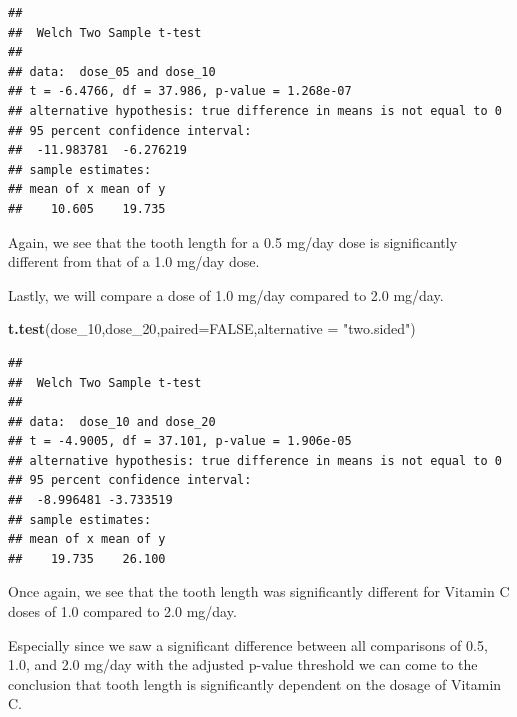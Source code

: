 \documentclass[
]{article}
\newenvironment{Shaded}{\begin{snugshade}}{\end{snugshade}}
\newcommand{\DataTypeTok}[1]{\textcolor[rgb]{0.13,0.29,0.53}{#1}}
\newcommand{\DecValTok}[1]{\textcolor[rgb]{0.00,0.00,0.81}{#1}}
\newcommand{\KeywordTok}[1]{\textcolor[rgb]{0.13,0.29,0.53}{\textbf{#1}}}
\newcommand{\NormalTok}[1]{#1}
\newcommand{\OtherTok}[1]{\textcolor[rgb]{0.56,0.35,0.01}{#1}}
\newcommand{\StringTok}[1]{\textcolor[rgb]{0.31,0.60,0.02}{#1}}
\begin{document}
\begin{verbatim}
## 
##  Welch Two Sample t-test
## 
## data:  dose_05 and dose_10
## t = -6.4766, df = 37.986, p-value = 1.268e-07
## alternative hypothesis: true difference in means is not equal to 0
## 95 percent confidence interval:
##  -11.983781  -6.276219
## sample estimates:
## mean of x mean of y 
##    10.605    19.735
\end{verbatim}

Again, we see that the tooth length for a 0.5 mg/day dose is
significantly different from that of a 1.0 mg/day dose.

Lastly, we will compare a dose of 1.0 mg/day compared to 2.0 mg/day.

\begin{Shaded}
\begin{Highlighting}[]
\KeywordTok{t.test}\NormalTok{(dose\_}\DecValTok{10}\NormalTok{,dose\_}\DecValTok{20}\NormalTok{,}\DataTypeTok{paired=}\OtherTok{FALSE}\NormalTok{,}\DataTypeTok{alternative =} \StringTok{"two.sided"}\NormalTok{)}
\end{Highlighting}
\end{Shaded}

\begin{verbatim}
## 
##  Welch Two Sample t-test
## 
## data:  dose_10 and dose_20
## t = -4.9005, df = 37.101, p-value = 1.906e-05
## alternative hypothesis: true difference in means is not equal to 0
## 95 percent confidence interval:
##  -8.996481 -3.733519
## sample estimates:
## mean of x mean of y 
##    19.735    26.100
\end{verbatim}

Once again, we see that the tooth length was significantly different for
Vitamin C doses of 1.0 compared to 2.0 mg/day.

Especially since we saw a significant difference between all comparisons
of 0.5, 1.0, and 2.0 mg/day with the adjusted p-value threshold we can
come to the conclusion that tooth length is significantly dependent on
the dosage of Vitamin C.
\end{document}
